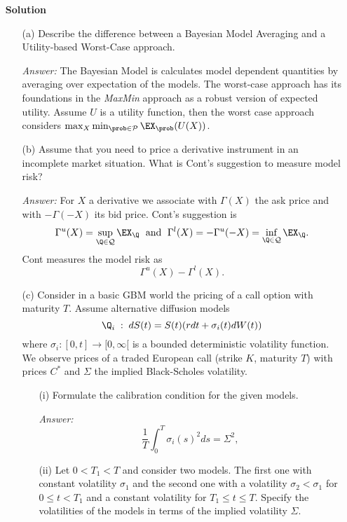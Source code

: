 \documentclass[11pt,a4paper,titlepage]{article}
\begin{document}
\begin{enumerate}
\item[]{\bf Solution}
\begin{itemize}
\item[(a)]
Describe the difference between a Bayesian Model Averaging and a Utility-based Worst-Case
approach.

{\it Answer:} The Bayesian Model is calculates model dependent quantities by averaging over  expectation of the models. The worst-case approach has its foundations in the {\it MaxMin} approach as a robust version of expected utility. Assume $U$ is a utility function, then
the worst case approach considers 
$\max _X \min_{\prob \in {\cal P}} \EX_{\prob}(U(X))$. 
 
\item[(b)] Assume that you need to price a derivative instrument in an incomplete market situation. What is Cont's suggestion to measure model risk?

{\it Answer:} 
For $X$ a derivative we associate with
$\Gamma(X)$ the ask price and with $-\Gamma(-X)$ its bid price.
Cont's suggestion is
$$
\Gamma^u(X)=\sup_{\Q \in {\cal Q}} \EX_{\Q} \; \mbox{ and } \;
\Gamma^l(X)= -\Gamma^u(-X)=\inf_{\Q \in {\cal Q}} \EX_{\Q}.
$$
Cont measures the model risk as 
$$
\Gamma^u(X)- 
\Gamma^l(X).
$$



\item[(c)] 
Consider in a basic GBM world the pricing of a call option with maturity $T$. 
Assume alternative diffusion models
\begin{equation}
\Q_i\;:\; dS(t) = S(t)(r dt + \sigma_i(t) dW(t))
\end{equation}
where $ \sigma_i: [0,t] \rightarrow [0, \infty[ $ is a bounded deterministic volatility function.
We observe prices of a traded European call (strike $K$, maturity $T$) with prices $C^*$ and
$\Sigma$ the implied Black-Scholes volatility.
\begin{itemize}
\item[(i)] 
Formulate the calibration condition for the given models.

{\it Answer:}  
\begin{equation}
\frac{1}{T} \int_0^T  \sigma_i(s)^2 ds = \Sigma^2,
\end{equation}
\item[(ii)]
Let $0< T_1 <T$ and consider two models. The first one with constant volatility $\sigma_1$ and the second one with a volatility $\sigma_2 < \sigma _1$ for $0 \leq t <T_1$ and a constant volatility for $T_1\leq t \leq T$. Specify  the  volatilities of the models in terms of the implied volatility $\Sigma $.


\end{itemize}
\end{itemize}
\end{enumerate}
\end{document}
